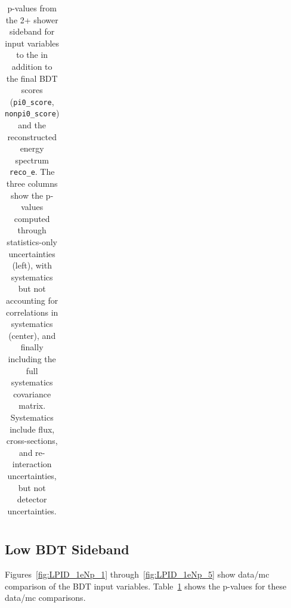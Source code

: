 \begin{table}[H]
\begin{tabular}{| c | c | c | c | c | c | c |}
 \end{tabular}
 \caption{\label{tab:LOWPIDppvalues}p-values from the 2+ shower \npsel sideband for input variables to the \npsel in addition to the final BDT scores (\texttt{pi0\_score}, \texttt{nonpi0\_score}) and the reconstructed energy spectrum \texttt{reco\_e}. The three columns show the p-values computed through statistics-only uncertainties (left), with systematics but not accounting for correlations in systematics (center), and finally including the full systematics covariance matrix. Systematics include flux, cross-sections, and re-interaction uncertainties, but not detector uncertainties.}
\end{table}

\subsection{\npsel Low BDT Sideband}
\label{app:sideband:1eNplowpid}
Figures~\ref{fig:LPID_1eNp_1} through~\ref{fig:LPID_1eNp_5} show data/mc comparison of the \npsel BDT input variables. Table~\ref{tab:LOWPIDppvalues} shows the p-values for these data/mc comparisons.

